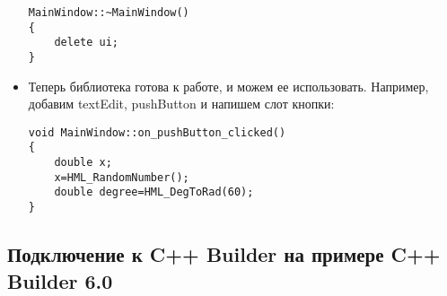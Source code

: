 \begin{itemize}
\begin{lstlisting}[label=install_03_qt,caption=Пример файла mainwindow.cpp с подключенной библиотекой]
MainWindow::~MainWindow()
{
    delete ui;
}
\end{lstlisting}

\item Теперь библиотека готова к работе, и можем ее использовать. Например, добавим textEdit, pushButton и напишем слот кнопки:
\begin{lstlisting}[label=install_04_qt,caption=Пример использования]
void MainWindow::on_pushButton_clicked()
{
    double x;
    x=HML_RandomNumber();
    double degree=HML_DegToRad(60);
}
\end{lstlisting}
\end{itemize}

\subsection{Подключение к C++ Builder на примере C++ Builder 6.0}
